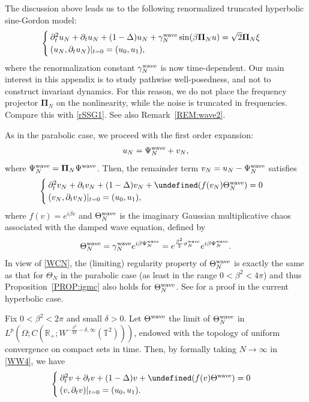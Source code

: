\documentclass[letterpaper, 11pt,  reqno]{amsart}
\theoremstyle{myremark}
\newcommand{\Ta}{\Theta}
\newcommand{\1}{\hspace{0.5mm}\text{I}\hspace{0.5mm}}
\newcommand{\R}{\mathbb{R}}
\newcommand{\T}{\mathbb{T}}
\let\Im=\undefined\DeclareMathOperator*{\Im}{Im}
\newcommand{\Pii}{\mathbf{\Pi}}
\newcommand{\al}{\alpha}
\newcommand{\be}{\beta}
\newcommand{\dl}{\delta}
\newcommand{\Dl}{\Delta}
\newcommand{\g}{\gamma}
\newcommand{\s}{\sigma}
\newcommand{\dt}{\partial_t}
\renewcommand{\O}{\Omega}
\renewcommand{\H}{\mathcal{H}}
\newcommand{\wave}{\textup{wave}}
\numberwithin{equation}{section}
\numberwithin{theorem}{section}
\begin{document}
The discussion above leads us to the following renormalized 
truncated hyperbolic sine-Gordon model:
\begin{align}
\begin{cases}
\dt^2 u_N + \dt u_N + (1- \Dl)  u_N   +  \g_N^\wave \sin(\be \Pii_N u) = \sqrt{2}\Pii_N \xi\\
(u_N, \dt u_N) |_{t = 0} = (u_0, u_1), 
\end{cases}
\label{WW3}
\end{align}
where the renormalization constant $\g_N^\wave$ is now time-dependent.
Our main interest in this appendix is 
to study pathwise well-posedness, 
and not to construct invariant dynamics.
For this reason, 
we do not place  the frequency projector $\Pii_N$ on the nonlinearity, 
while 
the noise is truncated in frequencies.
Compare this with  \eqref{rSSG1}.
See also Remark~\ref{REM:wave2}.








As in the parabolic case, 
we  proceed with the  first order expansion: 
\begin{align*}
u_N = \Psi_N^\wave + v_N, 
\end{align*}
where $\Psi_N^\wave = \Pii_N \Psi^\wave$.
Then, the remainder term $v_N = u_N - \Psi_N^\wave$
satisfies
\begin{align}
\begin{cases}
 \dt^2 v_N +  \dt v_N  + (1-\Dl)  v_N 
+ \Im (f( v_N) \Ta_N^\wave)= 0\\
(v_N, \dt v_N) |_{t = 0} = (u_0, u_1), 
\end{cases}
\label{WW4}
\end{align}
where $f(v) = e^{i \be v}$
and $\Theta_N^\wave$ is the  imaginary Gaussian multiplicative chaos
associated with the damped wave equation, 
 defined by
\begin{align*}
\Ta_N^\wave  = \g_N^\wave  e^{ i \be \Psi_N^\wave}
= e^{\frac{\be^2}{2}\s_N^\wave}
e^{ i \be \Psi_N^\wave}.
\end{align*}
In view of \eqref{WCN}, 
the (limiting) regularity property of 
$\Ta_N^\wave$ is exactly the same as that 
for $\Ta_N$ in the parabolic case
(as least in the range $0 < \be^2 < 4\pi$)
and thus Proposition~\ref{PROP:igmc}
also holds for $\Ta_N^\wave$.
See \cite[Lemma 2.2]{ORSW}
for a proof in the current hyperbolic case.


Fix $0 < \be^2 < 2\pi$
and small $\dl > 0$. %
Let $\Ta^\wave$
 the limit of $\Ta_N^\wave$
in 
$L^p(\O;C(\R_+;  W^{- \frac{\be^2}{4\pi} - \dl, \infty}(\T^2)))$, 
endowed with the 
topology of uniform convergence on compact sets in time.
Then, by formally taking $N \to \infty$ in \eqref{WW4}, we have
\begin{align}
\begin{cases}
 \dt^2 v +  \dt v  + (1-\Dl)  v
+ \Im (f( v) \Ta^\wave)= 0\\
(v, \dt v) |_{t = 0} = (u_0, u_1). %
\end{cases}
\label{WW4a}
\end{align}
\end{document}
